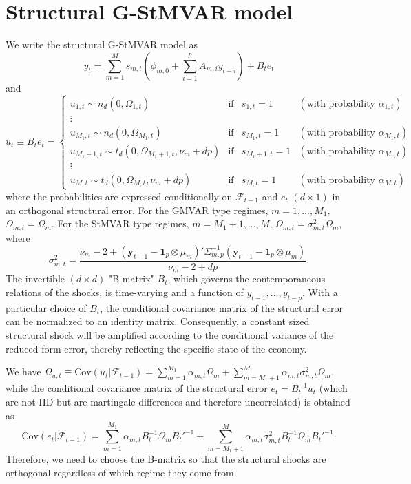 \documentclass[nojss]{jss} %
\begin{document}
\section{Structural G-StMVAR model}\label{sec:structural_model}
We write the structural G-StMVAR model \citep{Virolainen2:2021} as
\begin{equation}
y_t = \sum_{m=1}^Ms_{m,t}(\phi_{m,0}+\sum_{i=1}^pA_{m,i}y_{t-i}) + B_te_t
\end{equation}
and
\begin{equation}
u_t\equiv B_te_t =
\left\lbrace\begin{matrix}
u_{1,t}\sim n_d(0,\Omega_{1,t}) & \text{if} & s_{1,t}=1 & (\text{with probability } \alpha_{1,t}) \\
\vdots & & & \\
u_{M_1,t}\sim n_d(0,\Omega_{M_1,t}) & \text{if} & s_{M_1,t}=1 & (\text{with probability } \alpha_{M_1,t}) \\
u_{M_1+1,t}\sim t_d(0,\Omega_{M_1+1,t},\nu_m + dp) & \text{if} & s_{M_1+1,t}=1 & (\text{with probability } \alpha_{M_1,t}) \\
\vdots & & & \\
u_{M,t}\sim t_d(0,\Omega_{M,t},\nu_m + dp) & \text{if} & s_{M,t}=1 & (\text{with probability } \alpha_{M,t})
\end{matrix}\right.
\end{equation}
where the probabilities are expressed conditionally on $\mathcal{F}_{t-1}$ and $e_t$ $(d \times 1)$ in an orthogonal structural error.  For the GMVAR type regimes, $m=1,...,M_1$‚ $\Omega_{m,t}=\Omega_m$.  For the StMVAR type regimes,  $m=M_1+1,...,M$,  $\Omega_{m,t}=\sigma_{m,t}^2\Omega_m$, where
\begin{equation}\label{eq:sigma_mt}
\sigma_{m,t}^2 = \frac{\nu_m - 2 + (\boldsymbol{y}_{t-1} - \boldsymbol{1}_p\otimes\mu_m)'\Sigma_{m,p}^{-1}(\boldsymbol{y}_{t-1} - \boldsymbol{1}_p\otimes\mu_m)}{\nu_m - 2 + dp}.
\end{equation}
The invertible $(d\times d)$ "B-matrix" $B_t$, which governs the contemporaneous relations of the shocks, is time-varying and a function of $y_{t-1},..., y_{t-p}$. With a particular choice of $B_t$,  the conditional covariance matrix of the structural error can be normalized to an identity matrix. Consequently,  a constant sized structural shock will be amplified according to the conditional variance of the reduced form error, thereby reflecting the specific state of the economy.

We have $\Omega_{u,t}\equiv\text{Cov}(u_t|\mathcal{F}_{t-1})=\sum_{m=1}^{M_1}\alpha_{m,t}\Omega_m + \sum_{m=M_1+1}^{M}\alpha_{m,t}\sigma_{m,t}^2\Omega_m$,  while the conditional covariance matrix of the structural error $e_t=B_t^{-1}u_t$ (which are not IID but are martingale differences and therefore uncorrelated) is obtained as
\begin{equation}
\text{Cov}(e_t|\mathcal{F}_{t-1})=\sum_{m=1}^{M_1}\alpha_{m,t}B_t^{-1}\Omega_mB_t'^{-1} + \sum_{m=M_1+1}^{M}\alpha_{m,t}\sigma_{m,t}^2B_t^{-1}\Omega_mB_t'^{-1}.
\end{equation}
Therefore, we need to choose the B-matrix so that the structural shocks are orthogonal regardless of which regime they come from.
\end{document}
